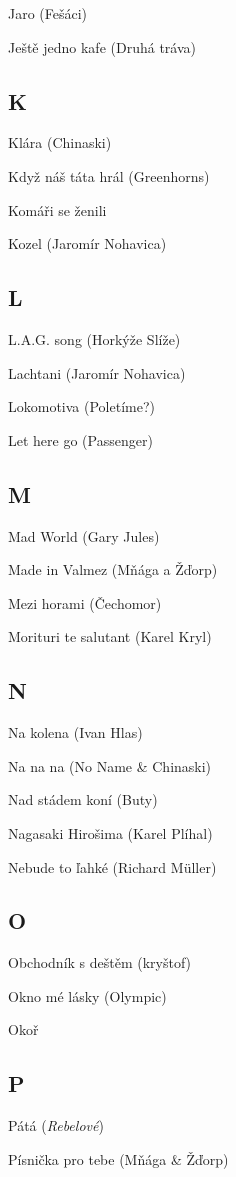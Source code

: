 \begin{multicols}{2}
Jaro (Fešáci)

Ještě jedno kafe (Druhá tráva)

\subsection*{K}
Klára (Chinaski)

Když náš táta hrál (Greenhorns)

Komáři se ženili

Kozel (Jaromír Nohavica)

\subsection*{L}
L.A.G. song (Horkýže Slíže)

Lachtani (Jaromír Nohavica)

Lokomotiva (Poletíme?)

Let here go (Passenger)

\subsection*{M}
Mad World (Gary Jules)

Made in Valmez (Mňága a Žďorp)

Mezi horami (Čechomor)

Morituri te salutant (Karel Kryl)

\subsection*{N}
Na kolena (Ivan Hlas)

Na na na (No Name \& Chinaski)

Nad stádem koní (Buty)

Nagasaki Hirošima (Karel Plíhal)

Nebude to ľahké (Richard Müller)

\subsection*{O}
Obchodník s deštěm (kryštof)

Okno mé lásky (Olympic)

Okoř

\subsection*{P}
Pátá (\emph{Rebelové})

Písnička pro tebe (Mňága \& Žďorp)


\end{multicols}
